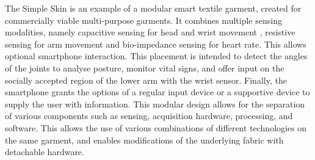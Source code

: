 \documentclass{sigchi}
\begin{document}
The Simple Skin \cite{simpleskin} is an example of a modular smart textile garment, created for commercially viable multi-purpose garments. It combines multiple sensing modalities, namely capacitive sensing for head and wrist movement , resistive sensing for arm movement
and bio-impedance sensing for heart rate. This allows optional smartphone interaction. This placement is intended to detect the angles of the joints to analyse posture, monitor vital signs, and offer input on the socially accepted region of the lower arm with the wrist sensor. Finally, the smartphone grants the options of a regular input device or a supportive device to supply the user with  information. This modular design allows for the separation of various components such as sensing, acquisition hardware, processing, and software. This allows the use of various combinations of different technologies on the same garment, and enables modifications of the underlying fabric with detachable hardware. \cite{simpleskin}
\end{document}
